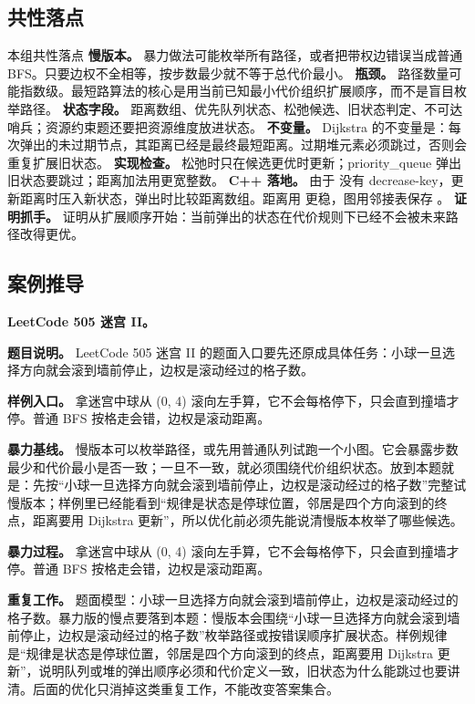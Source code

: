 \subsection{共性落点}

\begin{principlebox}{本组共性落点}
\textbf{慢版本。} 暴力做法可能枚举所有路径，或者把带权边错误当成普通 BFS。只要边权不全相等，按步数最少就不等于总代价最小。
\textbf{瓶颈。} 路径数量可能指数级。最短路算法的核心是用当前已知最小代价组织扩展顺序，而不是盲目枚举路径。
\textbf{状态字段。} 距离数组、优先队列状态、松弛候选、旧状态判定、不可达哨兵；资源约束题还要把资源维度放进状态。
\textbf{不变量。} Dijkstra 的不变量是：每次弹出的未过期节点，其距离已经是最终最短距离。过期堆元素必须跳过，否则会重复扩展旧状态。
\textbf{实现检查。} 松弛时只在候选更优时更新；priority\_queue 弹出旧状态要跳过；距离加法用更宽整数。
\textbf{C++ 落地。} 由于  没有 decrease-key，更新距离时压入新状态，弹出时比较距离数组。距离用  更稳，图用邻接表保存 。
\textbf{证明抓手。} 证明从扩展顺序开始：当前弹出的状态在代价规则下已经不会被未来路径改得更优。
\end{principlebox}

\subsection{案例推导}

\noindent\textbf{LeetCode 505 迷宫 II。}

\textbf{题目说明。} LeetCode 505 迷宫 II 的题面入口要先还原成具体任务：小球一旦选择方向就会滚到墙前停止，边权是滚动经过的格子数。

\textbf{样例入口。} 拿迷宫中球从 (0, 4) 滚向左手算，它不会每格停下，只会直到撞墙才停。普通 BFS 按格走会错，边权是滚动距离。

\textbf{暴力基线。} 慢版本可以枚举路径，或先用普通队列试跑一个小图。它会暴露步数最少和代价最小是否一致；一旦不一致，就必须围绕代价组织状态。放到本题就是：先按“小球一旦选择方向就会滚到墙前停止，边权是滚动经过的格子数”完整试慢版本；样例里已经能看到“规律是状态是停球位置，邻居是四个方向滚到的终点，距离要用 Dijkstra 更新”，所以优化前必须先能说清慢版本枚举了哪些候选。

\textbf{暴力过程。} 拿迷宫中球从 (0, 4) 滚向左手算，它不会每格停下，只会直到撞墙才停。普通 BFS 按格走会错，边权是滚动距离。

\textbf{重复工作。} 题面模型：小球一旦选择方向就会滚到墙前停止，边权是滚动经过的格子数。暴力版的慢点要落到本题：慢版本会围绕“小球一旦选择方向就会滚到墙前停止，边权是滚动经过的格子数”枚举路径或按错误顺序扩展状态。样例规律是“规律是状态是停球位置，邻居是四个方向滚到的终点，距离要用 Dijkstra 更新”，说明队列或堆的弹出顺序必须和代价定义一致，旧状态为什么能跳过也要讲清。后面的优化只消掉这类重复工作，不能改变答案集合。

